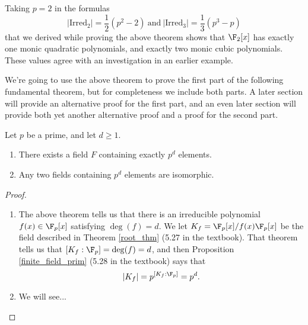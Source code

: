 \documentclass[math1530-lecture-notes]{subfiles}
\begin{document}
\begin{example}
  Taking $p=2$ in the formulas \[
    \left| \text{Irred}_2 \right| =\frac{1}{2}(p^2-2) ~\text{and}~ \left| \text{Irred}_3 \right|
    =\frac{1}{3}(p^3-p)
  \] that we derived while proving the above theorem shows that $\F_2[x]$ has exactly one monic
  quadratic polynomials, and exactly two monic cubic polynomials. These values agree with an
  investigation in an earlier example.
\end{example}

We're going to use the above theorem to prove the first part of the following fundamental theorem,
but for completeness we include both parts. A later section will provide an alternative proof for
the first part, and an even later section will provide both yet another alternative proof and a
proof for the second part.
\begin{theorem}{}
  Let $p$ be a prime, and let $d\ge 1$.
  \begin{enumerate}
    \item There exists a field $F$ containing exactly $p^d$ elements.
    \item Any two fields containing $p^d$ elements are isomorphic.
  \end{enumerate}
\end{theorem}
\begin{proof}[Proof]
  \begin{enumerate}
    \item The above theorem tells us that there is an irreducible polynomial $f(x)\in \F_p[x]$
      satisfying $\deg(f)=d$. We let $K_f=\F_p[x] / f(x)\F_p[x]$ be the field described in Theorem
      \ref{root_thm} (5.27 in the textbook). That theorem tells us that $\left[K_f :
      \F_p\right]=\deg(f)=d$, and then Proposition \ref{finite_field_prim} (5.28 in the textbook)
      says that \[
        \left| K_f \right| =p^{\left[K_f : \F_p\right]}=p^d
      .\] 
    \item We will see...
  \end{enumerate}
\end{proof}
\end{document}
